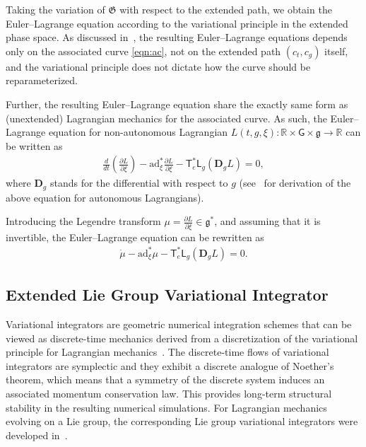 \documentclass[letterpaper, 10pt, conference]{ieeeconf}
\newcommand{\parenth}[1]{\ensuremath{\left( #1 \right)}}
\newcommand{\deriv}[2]{\ensuremath{\frac{\partial #1}{\partial #2}}}
\newcommand{\G}{\ensuremath{\mathsf{G}}}
\newcommand{\T}{\ensuremath{\mathsf{T}}}
\renewcommand{\L}{\ensuremath{\mathsf{L}}}
\renewcommand{\Re}{\ensuremath{\mathbb{R}}}
\newcommand{\D}{\ensuremath{\mathbf{D}}}
\newcommand{\ad}{\ensuremath{\mathrm{ad}}}
\newcommand{\g}{\ensuremath{\mathfrak{g}}}
\begin{document}
Taking the variation of $\mathfrak{G}$ with respect to the extended path, we obtain the Euler--Lagrange equation according to the variational principle in the extended phase space. 
As discussed in~\cite[Sec. 4.2.2]{MarWesAN01}, the resulting Euler--Lagrange equations depends only on the associated curve \eqref{eqn:ac}, not on the extended path $(c_t,c_g)$ itself, and the variational principle does not dictate how the curve should be reparameterized. 

Further, the resulting Euler--Lagrange equation share the exactly same form as (unextended) Lagrangian mechanics for the associated curve. 
As such, the Euler--Lagrange equation for non-autonomous Lagrangian $L(t,g,\xi):\Re\times\G\times\g\rightarrow \Re$ can be written as
\begin{align}
    \frac{d}{dt}\!\parenth{\deriv{L}{\xi}} - \ad^*_\xi \deriv{L}{\xi} - \T^*_e \L_g (\D_g L) = 0, \label{eqn:EL}
\end{align}
where $\D_g$ stands for the differential with respect to $g$ (see~\cite[Sec. 8.6.3]{LeeLeo17} for derivation of the above equation for autonomous Lagrangians).

Introducing the Legendre transform $\mu = \deriv{L}{\xi} \in\g^*$, and assuming that it is invertible, the Euler--Lagrange equation can be rewritten as
\begin{align}
    \dot \mu - \ad^*_{\xi} \mu - \T^*_e \L_g (\D_g L) = 0. \label{eqn:HE}
\end{align}

\subsection{Extended Lie Group Variational Integrator}

Variational integrators are geometric numerical integration schemes that can be viewed as discrete-time mechanics derived from a discretization of the variational principle for Lagrangian mechanics~\cite{MarWesAN01}.
The discrete-time flows of variational integrators are symplectic and they exhibit a discrete analogue of Noether's theorem, which means that a symmetry of the discrete system induces an associated momentum conservation law. This provides long-term structural stability in the resulting numerical simulations. 
For Lagrangian mechanics evolving on a Lie group, the corresponding Lie group variational integrators were developed in~\cite{LeeLeoCMAME07,Leo04,Lee08}.
\end{document}
